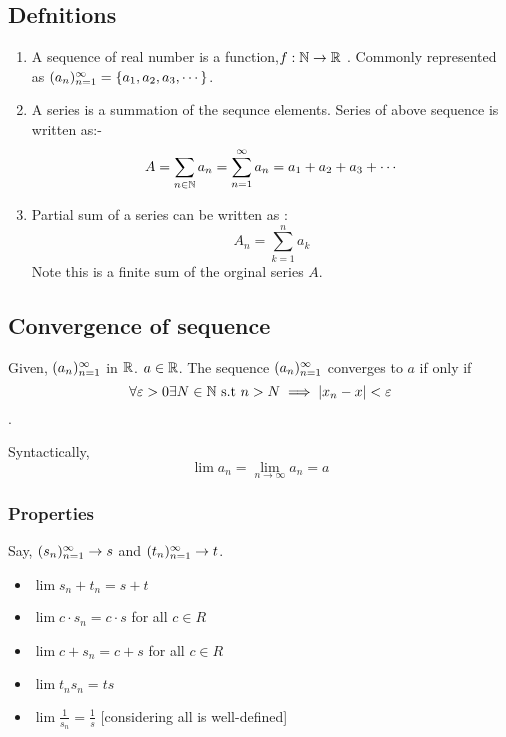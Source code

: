 \documentclass[
]{article}
\providecommand{\tightlist}{%
  \setlength{\itemsep}{0pt}\setlength{\parskip}{0pt}}
\begin{document}
\hypertarget{defnitions}{%
\subsection{Defnitions}\label{defnitions}}

\begin{enumerate}
\def\labelenumi{\arabic{enumi}.}
\item
  A sequence of real number is a function,\(f:\mathbb{N} \rightarrow \mathbb{R}\) . Commonly
  represented as \((a_n)_{n=1}^{\infty} = \left\{a_1, a_2, a_3, \cdots\right\}\).
\item
  A series is a summation of the sequnce elements. Series of above
  sequence is written as:- \[
  A = \sum_{n \in \mathbb{N}} a_n=\sum_{n=1}^{\infty} a_n = a_1+a_2+a_3+\cdots
  \]
\item
  Partial sum of a series can be written as :
  \[A_n = \sum_{k=1}^{n}a_k\] Note this is a finite sum of the orginal
  series \(A\).
\end{enumerate}

\hypertarget{convergence-of-sequence}{%
\subsection{Convergence of sequence}\label{convergence-of-sequence}}

Given, \((a_n)_{n=1}^{\infty}\) in \(\mathbb{R}\). \(a\in \mathbb{R}\). The sequence
\((a_n)_{n=1}^{\infty}\) converges to \(a\) if only if
\[\forall \varepsilon>0 \exists N \in \mathbb{N} \text{ s.t } n>N \implies|x_n-x|<\varepsilon\].

Syntactically, \[\lim a_n = \lim_{n\rightarrow \infty}a_n = a\]

\hypertarget{properties}{%
\subsubsection{Properties}\label{properties}}

Say, \((s_n)_{n=1}^{\infty}\rightarrow s\) and \((t_n)_{n=1}^{\infty}\rightarrow t\).

\begin{itemize}
\tightlist
\item
  \(\lim s_n + t_n = s+t\)
\item
  \(\lim c\cdot s_n = c\cdot s\) for all \(c \in R\)
\item
  \(\lim c+ s_n = c+ s\) for all \(c \in R\)
\item
  \(\lim t_n s_n = ts\)
\item
  \(\lim \frac{1}{s_n} = \frac{1}{s}\) {[}considering all is
  well-defined{]}
\end{itemize}
\end{document}
